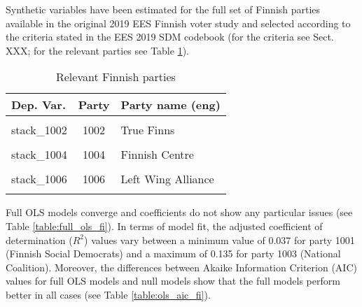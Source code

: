 \documentclass[
]{article}
\begin{document}
Synthetic variables have been estimated for the full set of Finnish parties available in the original
2019 EES Finnish voter study and selected according to the criteria stated in the EES 2019 SDM codebook (for the criteria see Sect. XXX; for the relevant parties see Table \ref{table:relprty_tab_fi}).

\begin{table}[!h]

\caption{\label{tab:unnamed-chunk-62}Relevant Finnish parties \label{table:relprty_tab_fi}}
\centering
\begin{tabular}[t]{lcl}
\toprule
Dep. Var. & Party & Party name (eng)\\
\midrule
\cellcolor{gray!6}{stack\_1001} & \cellcolor{gray!6}{1001} & \cellcolor{gray!6}{Finnish Social Democrats}\\
stack\_1002 & 1002 & True Finns\\
\cellcolor{gray!6}{stack\_1003} & \cellcolor{gray!6}{1003} & \cellcolor{gray!6}{National Coalition}\\
stack\_1004 & 1004 & Finnish Centre\\
\cellcolor{gray!6}{stack\_1005} & \cellcolor{gray!6}{1005} & \cellcolor{gray!6}{Green Union}\\
\addlinespace
stack\_1006 & 1006 & Left Wing Alliance\\
\cellcolor{gray!6}{stack\_1007} & \cellcolor{gray!6}{1007} & \cellcolor{gray!6}{Swedish People's Party}\\
\bottomrule
\end{tabular}
\end{table}

Full OLS models converge and coefficients do not show any particular issues (see Table
\ref{table:full_ols_fi}).
In terms of model fit, the adjusted coefficient of determination (\(R^2\)) values vary between
a minimum value of 0.037
for party 1001
(Finnish Social Democrats)
and a maximum of 0.135
for party 1003
(National Coalition).
Moreover, the differences between Akaike Information Criterion (AIC) values for full OLS models and null
models show that the full models perform better in all cases (see Table \ref{table:ols_aic_fi}).
\end{document}
